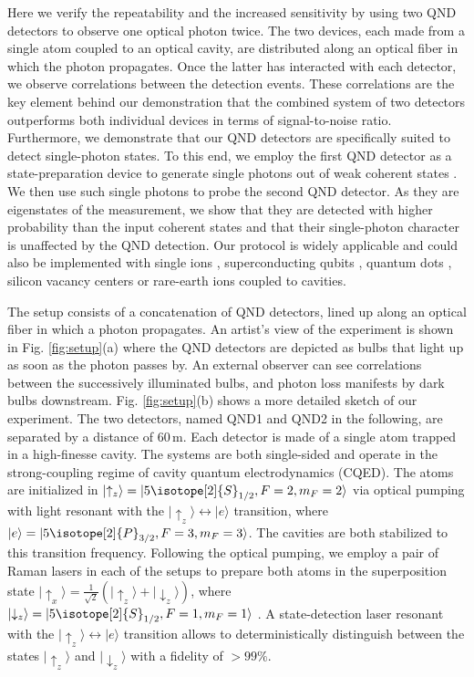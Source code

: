 \documentclass[prl,amsmath,amssymb,bibnotes,aps,longbibliography,12pt]{revtex4-1}
\newcommand{\ket}[1]{|{#1}\rangle}
\begin{document}
Here we verify the repeatability and the increased sensitivity by using two QND detectors to observe one optical photon twice. The two devices, each made from a single atom coupled to an optical cavity, are distributed along an optical fiber in which the photon propagates. Once the latter has interacted with each detector, we observe correlations between the detection events. These correlations are the key element behind our demonstration that the combined system of two detectors outperforms both individual devices in terms of signal-to-noise ratio. Furthermore, we demonstrate that our QND detectors are specifically suited to detect single-photon states. To this end, we employ the first QND detector as a state-preparation device to generate single photons out of weak coherent states \cite{daiss2019}. We then use such single photons to probe the second QND detector. As they are eigenstates of the measurement, we show that they are detected with higher probability than the input coherent states and that their single-photon character is unaffected by the QND detection. Our protocol is widely applicable and could also be implemented with single ions \cite{mundt2002, takahashi2020}, superconducting qubits \cite{kono2018quantum, besse2018}, quantum dots \cite{fushman2008, kim2013, desantis2017}, silicon vacancy centers \cite{bhaskar2020} or rare-earth ions \cite{chen2020} coupled to cavities.

The setup consists of a concatenation of QND detectors, lined up along an optical fiber in which a photon propagates. An artist's view of the experiment is shown in Fig. \ref{fig:setup}(a) where the QND detectors are depicted as bulbs that light up as soon as the photon passes by. An external observer can see correlations between the successively illuminated bulbs, and photon loss manifests by dark bulbs downstream. Fig. \ref{fig:setup}(b) shows a more detailed sketch of our experiment. The two detectors, named QND1 and QND2 in the following, are separated by a distance of $60\,\mathrm{m}$. Each detector is made of a single  atom trapped in a high-finesse cavity. The systems are both single-sided and operate in the strong-coupling regime of cavity quantum electrodynamics (CQED). The atoms are initialized in $\ket{\uparrow_z}=\ket{5\isotope[2]{S}_{1/2}, F=2, m_F=2}$ via optical pumping with light resonant with the $\ket{\uparrow_z}\leftrightarrow \ket{e}$ transition, where $\ket{e}=\ket{5\isotope[2]{P}_{3/2}, F=3, m_F=3}$. The cavities are both stabilized to this transition frequency. Following the optical pumping, we employ a pair of Raman lasers in each of the setups to prepare both atoms in the
superposition state $\ket{\uparrow_x}=\frac{1}{\sqrt{2}}(\ket{\uparrow_z}+\ket{\downarrow_z})$, where $\ket{\downarrow_z}=\ket{5\isotope[2]{S}_{1/2}, F=1, m_F=1}$ \cite{reiserer2013}. A state-detection laser resonant with the $\ket{\uparrow_z}\leftrightarrow\ket{e}$ transition allows to deterministically distinguish between the states $\ket{\uparrow_z}$ and $\ket{\downarrow_z}$ with a fidelity of $>99\%$.
\end{document}
